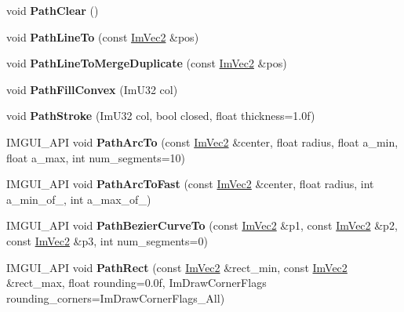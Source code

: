 \begin{DoxyCompactItemize}
\item 
\mbox{\label{structImDrawList_ae9ad5f4d638b1bfd9383618dc60e3f18}} 
void {\bfseries Path\+Clear} ()
\item 
\mbox{\label{structImDrawList_a828d944325ed58d8b57abd3647bffaaf}} 
void {\bfseries Path\+Line\+To} (const \hyperlink{structImVec2}{Im\+Vec2} \&pos)
\item 
\mbox{\label{structImDrawList_aa3dd11945fb62495f8b9e1392ed724e3}} 
void {\bfseries Path\+Line\+To\+Merge\+Duplicate} (const \hyperlink{structImVec2}{Im\+Vec2} \&pos)
\item 
\mbox{\label{structImDrawList_aea9301cb99ebf4b27f5d3959017567c9}} 
void {\bfseries Path\+Fill\+Convex} (Im\+U32 col)
\item 
\mbox{\label{structImDrawList_ac3172e376a4b77915bb22b6d8092b8b2}} 
void {\bfseries Path\+Stroke} (Im\+U32 col, bool closed, float thickness=1.\+0f)
\item 
\mbox{\label{structImDrawList_a6b954e6ec99e7a2ed05aca870655b2e0}} 
I\+M\+G\+U\+I\+\_\+\+A\+PI void {\bfseries Path\+Arc\+To} (const \hyperlink{structImVec2}{Im\+Vec2} \&center, float radius, float a\+\_\+min, float a\+\_\+max, int num\+\_\+segments=10)
\item 
\mbox{\label{structImDrawList_a6d307c6de1a6522e76fa410e8fe96fcc}} 
I\+M\+G\+U\+I\+\_\+\+A\+PI void {\bfseries Path\+Arc\+To\+Fast} (const \hyperlink{structImVec2}{Im\+Vec2} \&center, float radius, int a\+\_\+min\+\_\+of\+\_, int a\+\_\+max\+\_\+of\+\_)
\item 
\mbox{\label{structImDrawList_a495ca7dd4fd5a898e2414658321f4b18}} 
I\+M\+G\+U\+I\+\_\+\+A\+PI void {\bfseries Path\+Bezier\+Curve\+To} (const \hyperlink{structImVec2}{Im\+Vec2} \&p1, const \hyperlink{structImVec2}{Im\+Vec2} \&p2, const \hyperlink{structImVec2}{Im\+Vec2} \&p3, int num\+\_\+segments=0)
\item 
\mbox{\label{structImDrawList_ad6ad022baf347834fed05b1fe739fbf1}} 
I\+M\+G\+U\+I\+\_\+\+A\+PI void {\bfseries Path\+Rect} (const \hyperlink{structImVec2}{Im\+Vec2} \&rect\+\_\+min, const \hyperlink{structImVec2}{Im\+Vec2} \&rect\+\_\+max, float rounding=0.\+0f, Im\+Draw\+Corner\+Flags rounding\+\_\+corners=\+Im\+Draw\+Corner\+Flags\+\_\+\+All)

\end{DoxyCompactItemize}
